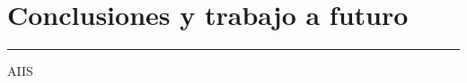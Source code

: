 
\chapter{Conclusiones y trabajo a futuro}\label{capit:cap5}
\vspace{-2.0325ex}%
\noindent
\rule{\textwidth}{0.5pt}
\vspace{-5.5ex}%
\newcommand{\pushline}{\Indp}%

AIIS\citep{navarro2014intervention}
\newpage
